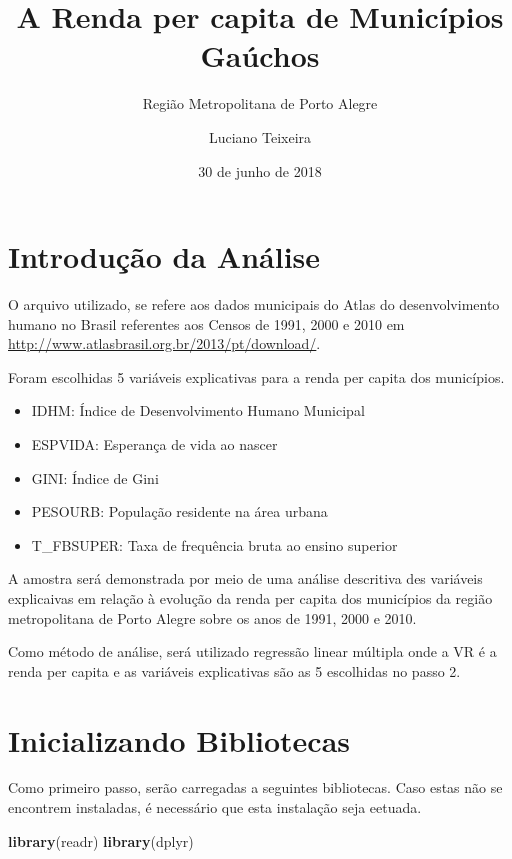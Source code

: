 \documentclass[]{article}
\title{A Renda per capita de Municípios Gaúchos}
\subtitle{Região Metropolitana de Porto Alegre}
\author{Luciano Teixeira}
\date{30 de junho de 2018}
\newenvironment{Shaded}{\begin{snugshade}}{\end{snugshade}}
\newcommand{\KeywordTok}[1]{\textcolor[rgb]{0.13,0.29,0.53}{\textbf{#1}}}
\newcommand{\NormalTok}[1]{#1}
\providecommand{\tightlist}{%
  \setlength{\itemsep}{0pt}\setlength{\parskip}{0pt}}
\begin{document}
\maketitle

{
\setcounter{tocdepth}{2}
\tableofcontents
}
\section{Introdução da Análise}\label{introducao-da-analise}

O arquivo utilizado, se refere aos dados municipais do Atlas do
desenvolvimento humano no Brasil referentes aos Censos de 1991, 2000 e
2010 em \url{http://www.atlasbrasil.org.br/2013/pt/download/}.

Foram escolhidas 5 variáveis explicativas para a renda per capita dos
municípios.

\begin{itemize}
\tightlist
\item
  IDHM: Índice de Desenvolvimento Humano Municipal
\item
  ESPVIDA: Esperança de vida ao nascer
\item
  GINI: Índice de Gini
\item
  PESOURB: População residente na área urbana
\item
  T\_FBSUPER: Taxa de frequência bruta ao ensino superior
\end{itemize}

A amostra será demonstrada por meio de uma análise descritiva des
variáveis explicaivas em relação à evolução da renda per capita dos
municípios da região metropolitana de Porto Alegre sobre os anos de
1991, 2000 e 2010.

Como método de análise, será utilizado regressão linear múltipla onde a
VR é a renda per capita e as variáveis explicativas são as 5 escolhidas
no passo 2.

\section{Inicializando Bibliotecas}\label{inicializando-bibliotecas}

Como primeiro passo, serão carregadas a seguintes bibliotecas. Caso
estas não se encontrem instaladas, é necessário que esta instalação seja
eetuada.

\begin{Shaded}
\begin{Highlighting}[]
\KeywordTok{library}\NormalTok{(readr)}
\KeywordTok{library}\NormalTok{(dplyr)}
\end{Highlighting}
\end{Shaded}
\end{document}
